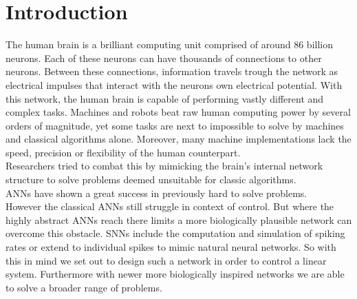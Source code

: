 \chapter{Introduction}


The human brain is a brilliant computing unit comprised of around 86 billion\cite{azevedo_equal_2009} neurons. Each of these neurons can have thousands of connections to other neurons. Between these connections, information travels trough the network as electrical impulses that interact with the neurons own electrical potential. With this network, the human brain is capable of performing vastly different and complex tasks. Machines and robots beat raw human computing power by several orders of magnitude, yet some tasks are next to impossible to solve by machines and classical algorithms alone. Moreover, many machine implementations lack the speed, precision or flexibility of the human counterpart.\\
Researchers tried to combat this by mimicking the brain's internal network structure to solve problems deemed unsuitable for classic algorithms.\\
\acp{ANN} have shown a great success in previously hard to solve problems.\\
However the classical \acp{ANN} still struggle in context of control.
But where the highly abstract \acp{ANN} reach there limits a more biologically plausible network can overcome this obstacle.
\acp{SNN} include the computation and simulation of spiking rates or extend to individual spikes to mimic natural neural networks. So with this in mind we set out to design such a network in order to control a linear system. Furthermore with newer more biologically inspired networks we are able to solve a broader range of problems. \\



